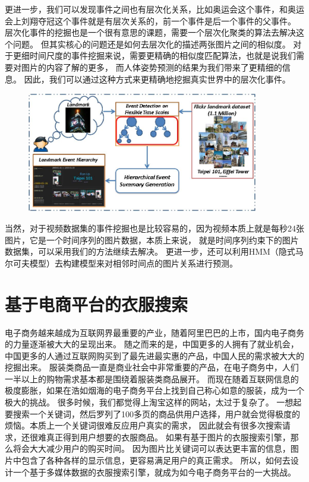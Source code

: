 更进一步，我们可以发现事件之间也有层次化关系，比如奥运会这个事件，和奥运会上刘翔夺冠这个事件就是有层次关系的，前一个事件是后一个事件的父事件。
层次化事件的挖掘也是一个很有意思的课题，需要一个层次化聚类的算法去解决这个问题。
但其实核心的问题还是如何去层次化的描述两张图片之间的相似度。
对于更细时间尺度的事件挖掘来说，需要更精确的相似度匹配算法，也就是说我们需要对图片的内容了解的更多，
而人体姿势预测的结果为我们带来了更精细的信息。
因此，我们可以通过这种方式来更精确地挖掘真实世界中的层次化事件。

\begin{figure}
\centering
\includegraphics[width=0.9\textwidth]{img/architecture.jpg}
\label{fig:architecture}
\end{figure}

当然，对于视频数据集的事件挖掘也是比较容易的，因为视频本质上就是每秒24张图片，它是一个时间序列的图片数据，本质上来说，
就是时间序列约束下的图片数据集，可以采用我们的方法继续去解决。
更进一步，还可以利用HMM（隐式马尔可夫模型）去构建模型来对相邻时间点的图片关系进行预测。


\section{基于电商平台的衣服搜索}
电子商务越来越成为互联网界最重要的产业，随着阿里巴巴的上市，国内电子商务的力量逐渐被大大的呈现出来。
随之而来的是，中国更多的人拥有了就业机会，中国更多的人通过互联网购买到了最先进最实惠的产品，中国人民的需求被大大的挖掘出来。
服装类商品一直是商业社会中非常重要的产品，在电子商务中，人们一半以上的购物需求基本都是围绕着服装类商品展开。
而现在随着互联网信息的极度膨胀，如果在浩如烟海的电子商务平台上找到自己称心如意的服装，成为一个极大的挑战。
很多时候，我们都觉得上淘宝这样的网站，太过于复杂了。
一想起要搜索一个关键词，然后罗列了100多页的商品供用户选择，用户就会觉得极度的烦恼。本质上一个关键词很难反应用户真实的需求，
因此就会有很多次搜索请求，还很难真正得到用户想要的衣服商品。
如果有基于图片的衣服搜索引擎，那么将会大大减少用户的购买时间。
因为图片比关键词可以表达更丰富的信息，图片中包含了各种各样的显示信息，更容易满足用户的真正需求。
所以，如何去设计一个基于多媒体数据的衣服搜索引擎，就成为如今电子商务平台的一大挑战。


